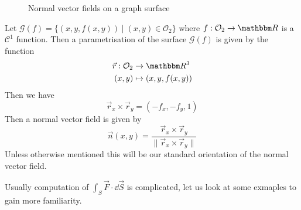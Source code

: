\documentclass[../Analysis-3]{subfiles}
\begin{document}
\begin{Eg}{}{}
    \begin{figure}
        \centering
        \caption{Normal vector fields on a graph surface}
        \label{fig2:27}
    \end{figure}
    Let $\mathcal{G}(f) = \{ (x,y,f(x,y)) \mid (x,y) \in \mathcal{O}_2\}$ where $f : \mathcal{O}_2 \to \R$ is a $\mathscr{C}^1$ function. Then a parametrisation of the surface $\mathcal{G}(f)$ is given by the function
    \begin{align*}
        \vec{r} : \mathcal{O}_2 & \to \R^3             \\
        (x,y)                   & \mapsto (x,y,f(x,y))
    \end{align*}
    Then we have
    \[
        \vec{r}_x \times \vec{r}_y = (-f_x, -f_y, 1)
    \]
    Then a normal vector field is given by
    \[
        \vec{n}(x,y) = \frac{\vec{r}_x \times \vec{r}_y}{\|\vec{r}_x \times \vec{r}_y \|}
    \]
    Unless otherwise mentioned this will be our standard orientation of the normal vector field.
\end{Eg}

Usually computation of $\int_S \vec{F} \cdot \dd \vec{S}$ is complicated, let us look at some exmaples to gain more familiarity.
\end{document}
